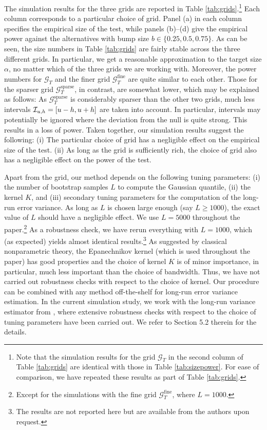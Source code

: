 \documentclass[12pt]{article}
\begin{document}
The simulation results for the three grids are reported in Table \ref{tab:grids}.\footnote{Note that the simulation results for the grid $\mathcal{G}_T$ in the second column of Table \ref{tab:grids} are identical with those in Table \ref{tab:sizepower}. For ease of comparison, we have repeated these results as part of Table \ref{tab:grids}.}
Each column corresponds to a particular choice of grid. Panel (a) in each column specifies the empirical size of the test, while panels (b)--(d) give the empirical power against the alternatives with bump size $b \in \{0.25,0.5,0.75\}$. 
As can be seen, the size numbers in Table \ref{tab:grids} are fairly stable across the three different grids. In particular, we get a reasonable approximation to the target size $\alpha$, no matter which of the three grids we are working with. Moreover, the power numbers for $\mathcal{G}_T$ and the finer grid $\mathcal{G}_T^{\text{fine}}$ are quite similar to each other. Those for the sparser grid $\mathcal{G}_T^{\text{sparse}}$, in contrast, are somewhat lower, which may be explained as follows: As $\mathcal{G}_T^{\text{sparse}}$ is considerably sparser than the other two grids, much less intervals $\mathcal{I}_{u, h} = [u-h,u+h]$ are taken into account. In particular, intervals may potentially be ignored where the deviation from the null is quite strong. This results in a loss of power.
Taken together, our simulation results suggest the following: (i) The particular choice of grid has a negligible effect on the empirical size of the test. (ii) As long as the grid is sufficiently rich, the choice of grid also has a negligible effect on the power of the test. 


Apart from the grid, our method depends on the following tuning parameters: (i) the number of bootstrap samples $L$ to compute the Gaussian quantile, (ii) the kernel $K$, and (iii) secondary tuning parameters for the computation of the long-run error variance. 
As long as $L$ is chosen large enough (say $L \ge 1000$), the exact value of $L$ should have a negligible effect. We use $L=5000$ throughout the paper.\footnote{Except for the simulations with the fine grid $\mathcal{G}_T^{\text{fine}}$, where $L=1000$.} As a robustness check, we have rerun everything with $L=1000$, which (as expected) yields almost identical results.\footnote{The results are not reported here but are available from the authors upon request.} 
As suggested by classical nonparametric theory, the Epanechnikov kernel (which is used throughout the paper) has good properties and the choice of kernel $K$ is of minor importance, in particular, much less important than the choice of bandwidth. Thus, we have not carried out robustness checks with respect to the choice of kernel.
Our procedure can be combined with any method off-the-shelf for long-run error variance estimation. In the current simulation study, we work with the long-run variance estimator from \cite{KhismatullinaVogt2020}, where extensive robustness checks with respect to the choice of tuning parameters have been carried out. We refer to Section 5.2 therein for the details.
\end{document}
